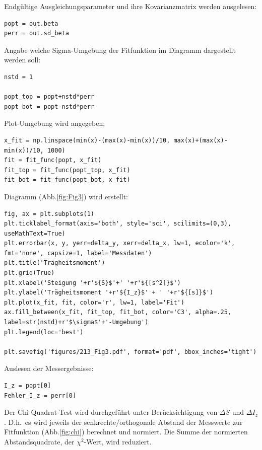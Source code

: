 \documentclass[a4paper,10pt]{article}
\begin{document}
Endgültige Ausgleichungsparameter und ihre Kovarianzmatrix werden ausgelesen:\begin{lstlisting}
popt = out.beta
perr = out.sd_beta

\end{lstlisting}

Angabe welche Sigma-Umgebung der Fitfunktion im Diagramm dargestellt werden soll:\begin{lstlisting}
nstd = 1

popt_top = popt+nstd*perr
popt_bot = popt-nstd*perr

\end{lstlisting}

Plot-Umgebung wird angegeben:\begin{lstlisting}
x_fit = np.linspace(min(x)-(max(x)-min(x))/10, max(x)+(max(x)-min(x))/10, 1000)
fit = fit_func(popt, x_fit)
fit_top = fit_func(popt_top, x_fit)
fit_bot = fit_func(popt_bot, x_fit)

\end{lstlisting}

Diagramm (Abb.\ref{fig:Fig3}) wird erstellt:\begin{lstlisting}
fig, ax = plt.subplots(1)
plt.ticklabel_format(axis='both', style='sci', scilimits=(0,3), useMathText=True)
plt.errorbar(x, y, yerr=delta_y, xerr=delta_x, lw=1, ecolor='k', fmt='none', capsize=1, label='Messdaten')
plt.title('Trägheitsmoment')
plt.grid(True)
plt.xlabel('Steigung '+r'${S}$'+' '+r'${[s^2]}$')
plt.ylabel('Trägheitsmoment '+r'${I_z}$' + ' '+r'${[s]}$')
plt.plot(x_fit, fit, color='r', lw=1, label='Fit')
ax.fill_between(x_fit, fit_top, fit_bot, color='C3', alpha=.25, label=str(nstd)+r'$\sigma$'+'-Umgebung')
plt.legend(loc='best')

plt.savefig('figures/213_Fig3.pdf', format='pdf', bbox_inches='tight')

\end{lstlisting}

Auslesen der Messergebnisse:\begin{lstlisting}
I_z = popt[0]
Fehler_I_z = perr[0]

\end{lstlisting}

Der Chi-Quadrat-Test wird durchgeführt unter Berücksichtigung von \(\Delta S\) und \(\Delta I_z\). D.h.~es wird jeweils der senkrechte/orthogonale Abstand der Messwerte zur Fitfunktion (Abb.\ref{fig:chi}) berechnet und normiert\fnrefa .
 Die Summe der normierten Abstandsquadrate, der \unboldmath\( \chi^{2}\)-Wert, wird  reduziert.\boldmath
\end{document}
